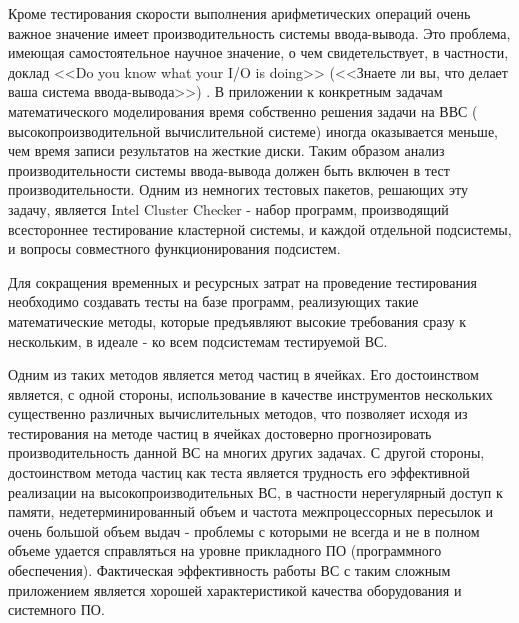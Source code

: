 Кроме тестирования скорости выполнения арифметических операций очень важное значение имеет производительность системы ввода-вывода. Это проблема, имеющая самостоятельное научное значение, о чем свидетельствует, в частности, доклад  <<Do you know what your I/O is doing>> (<<Знаете ли вы, что делает ваша система ввода-вывода>>) \cite{IOdoing}. В приложении к конкретным задачам математического моделирования время собственно решения задачи на ВВС ( высокопроизводительной вычислительной системе) иногда оказывается меньше, чем время записи результатов на жесткие диски.
Таким образом анализ производительности системы ввода-вывода должен быть включен в тест производительности.
Одним из немногих тестовых пакетов, решающих эту задачу, является Intel Cluster Checker - набор программ, производящий всестороннее тестирование кластерной системы, и каждой отдельной подсистемы, и вопросы совместного функционирования подсистем. 

Для сокращения временных и ресурсных затрат на проведение тестирования необходимо создавать тесты на базе программ, реализующих такие математические методы, которые предъявляют высокие требования сразу к нескольким, в идеале - ко всем подсистемам тестируемой ВС. 

Одним из таких методов является метод частиц в ячейках. Его достоинством является, с одной стороны, использование в качестве инструментов нескольких существенно различных вычислительных методов, что позволяет исходя из тестирования на методе частиц в ячейках достоверно прогнозировать производительность данной ВС на многих других задачах. С другой стороны, достоинством метода частиц как теста является трудность его эффективной реализации на высокопроизводительных ВС, в частности нерегулярный доступ к памяти, недетерминированный объем и частота межпроцессорных пересылок и очень большой объем выдач - проблемы с которыми не всегда и не в полном объеме удается справляться на уровне прикладного ПО (программного обеспечения). Фактическая эффективность работы ВС с таким сложным приложением является хорошей характеристикой качества оборудования и системного ПО.

